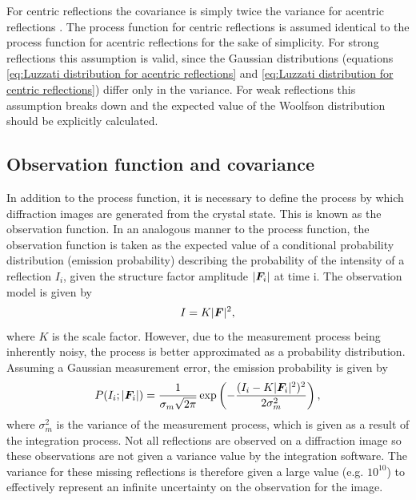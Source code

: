 For centric reflections the covariance is simply twice the variance for acentric reflections \cite{terwilliger1996bayesian}.
The process function for centric reflections is assumed identical to the process function for acentric reflections for the sake of simplicity.
For strong reflections this assumption is valid, since the Gaussian distributions (equations \ref{eq:Luzzati distribution for acentric reflections} and \ref{eq:Luzzati distribution for centric reflections}) differ only in the variance.
For weak reflections this assumption breaks down and the expected value of the Woolfson distribution should be explicitly calculated.

\subsection{Observation function and covariance}
\label{sub:Observation Function and covariance}
In addition to the process function, it is necessary to define the process by which diffraction images are generated from the crystal state.
This is known as the observation function.
In an analogous manner to the process function, the observation function is taken as the expected value of a conditional probability distribution (emission probability) describing the probability of the intensity of a reflection $I_i$, given the structure factor amplitude $|\boldsymbol{F}_i|$ at time i.
The observation model is given by \cite{otwinowski2003multiparametric}
\begin{equation}
    I = K |\boldsymbol{F}|^2,
    \label{eq:Observation Model}
\end{equation}
where $K$ is the scale factor.
However, due to the measurement process being inherently noisy, the process is better approximated as a probability distribution.
Assuming a Gaussian measurement error, the emission probability is given by
\begin{equation}
    P(I_i ; |\boldsymbol{F}_i|) = \frac{1}{\sigma_m \sqrt{2 \pi}} \exp \left(-\frac{(I_i - K|\boldsymbol{F}_i|^2)^2}{2 \sigma_m^2}\right),
\end{equation}
where $\sigma_m^2$ is the variance of the measurement process, which is given as a result of the integration process.
Not all reflections are observed on a diffraction image so these observations are not given a variance value by the integration software.
The variance for these missing reflections is therefore given a large value (e.g. $10^{10}$) to effectively represent an infinite uncertainty on the observation for the image.


